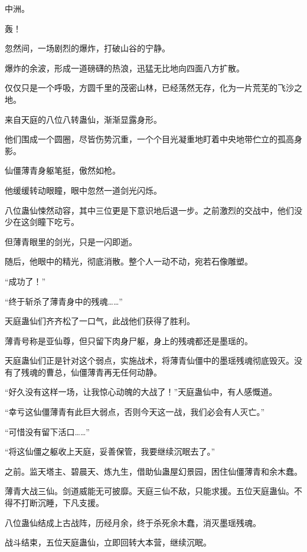 
\begin{this_body}



中洲。

轰！

忽然间，一场剧烈的爆炸，打破山谷的宁静。

爆炸的余波，形成一道磅礴的热浪，迅猛无比地向四面八方扩散。

仅仅只是一个呼吸，方圆千里的茂密山林，已经荡然无存，化为一片荒芜的飞沙之地。

来自天庭的八位八转蛊仙，渐渐显露身形。

他们围成一个圆圈，尽皆伤势沉重，一个个目光凝重地盯着中央地带伫立的孤高身影。

仙僵薄青身躯笔挺，傲然如枪。

他缓缓转动眼瞳，眼中忽然一道剑光闪烁。

八位蛊仙悚然动容，其中三位更是下意识地后退一步。之前激烈的交战中，他们没少在这剑瞳下吃亏。

但薄青眼里的剑光，只是一闪即逝。

随后，他眼中的精光，彻底消散。整个人一动不动，宛若石像雕塑。

“成功了！”

“终于斩杀了薄青身中的残魂……”

天庭蛊仙们齐齐松了一口气，此战他们获得了胜利。

薄青号称是亚仙尊，但只留下肉身尸躯，身上的残魂都还是墨瑶的。

天庭蛊仙们正是针对这个弱点，实施战术，将薄青仙僵中的墨瑶残魂彻底毁灭。没有了残魂的曹总，仙僵薄青再无任何动静。

“好久没有这样一场，让我惊心动魄的大战了！”天庭蛊仙中，有人感慨道。

“幸亏这仙僵薄青有此巨大弱点，否则今天这一战，我们必会有人灭亡。”

“可惜没有留下活口……”

“将这仙僵之躯收上天庭，妥善保管，我要继续沉眠去了。”

之前。监天塔主、碧晨天、炼九生，借助仙蛊屋幻景园，困住仙僵薄青和余木蠢。

薄青大战三仙。剑道威能无可披靡。天庭三仙不敌，只能求援。五位天庭蛊仙。不得不打断沉睡，下凡支援。

八位蛊仙结成上古战阵，历经月余，终于杀死余木蠢，消灭墨瑶残魂。

战斗结束，五位天庭蛊仙，立即回转大本营，继续沉眠。


\end{this_body}
